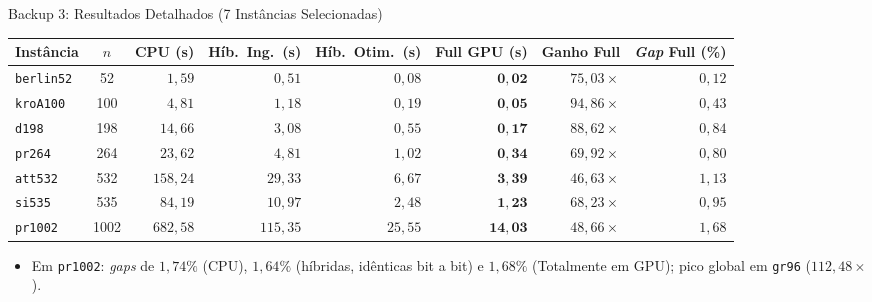 \begin{frame}{Backup 3: Resultados Detalhados (7 Instâncias Selecionadas)}
  \begin{slidetabeladensa}[0.56\textheight]
    \begin{tabular}{@{}lcrrrrrr@{}}
      \toprule
      \textbf{Instância} & $n$ & \textbf{CPU (s)} & \textbf{Híb.\ Ing.\ (s)} & \textbf{Híb.\ Otim.\ (s)} & \textbf{Full GPU (s)} & \textbf{Ganho Full} & \textbf{\emph{Gap} Full (\%)} \\
      \midrule
      \texttt{berlin52} & 52   & $1{,}59$   & $0{,}51$   & $0{,}08$  & $\mathbf{0{,}02}$  & $75{,}03\times$ & $0{,}12$ \\
      \texttt{kroA100}  & 100  & $4{,}81$   & $1{,}18$   & $0{,}19$  & $\mathbf{0{,}05}$  & $94{,}86\times$ & $0{,}43$ \\
      \texttt{d198}     & 198  & $14{,}66$  & $3{,}08$   & $0{,}55$  & $\mathbf{0{,}17}$  & $88{,}62\times$ & $0{,}84$ \\
      \texttt{pr264}    & 264  & $23{,}62$  & $4{,}81$   & $1{,}02$  & $\mathbf{0{,}34}$  & $69{,}92\times$ & $0{,}80$ \\
      \texttt{att532}   & 532  & $158{,}24$ & $29{,}33$  & $6{,}67$  & $\mathbf{3{,}39}$  & $46{,}63\times$ & $1{,}13$ \\
      \texttt{si535}    & 535  & $84{,}19$  & $10{,}97$  & $2{,}48$  & $\mathbf{1{,}23}$  & $68{,}23\times$ & $0{,}95$ \\
      \texttt{pr1002}   & 1002 & $682{,}58$ & $115{,}35$ & $25{,}55$ & $\mathbf{14{,}03}$ & $48{,}66\times$ & $1{,}68$ \\
      \bottomrule
    \end{tabular}
  \end{slidetabeladensa}

  \vspace{0.08cm}
  \begin{itemize}
    \footnotesize
    \item Em \texttt{pr1002}: \emph{gaps} de $1{,}74\%$ (CPU), $1{,}64\%$ (híbridas, idênticas bit a bit) e $1{,}68\%$ (Totalmente em GPU); pico global em \texttt{gr96} ($112{,}48\times$).
  \end{itemize}
\end{frame}

